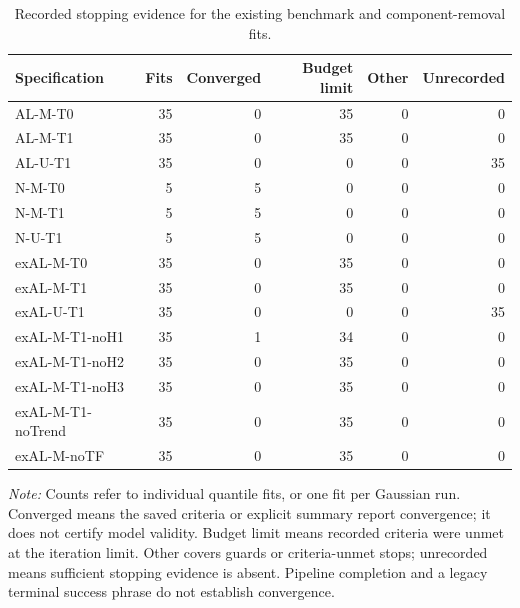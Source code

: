 \begin{table}[!htbp]
\centering
\begin{threeparttable}
\caption{Recorded stopping evidence for the existing benchmark and component-removal fits.}
\label{tab:comment2_fit_diagnostics}
\fontsize{8.5}{10.5}\selectfont
\begin{tabular}{lrrrrr}
\hline
Specification & Fits & Converged & Budget limit & Other & Unrecorded \\
\hline
AL-M-T0 & 35 & 0 & 35 & 0 & 0 \\
AL-M-T1 & 35 & 0 & 35 & 0 & 0 \\
AL-U-T1 & 35 & 0 & 0 & 0 & 35 \\
N-M-T0 & 5 & 5 & 0 & 0 & 0 \\
N-M-T1 & 5 & 5 & 0 & 0 & 0 \\
N-U-T1 & 5 & 5 & 0 & 0 & 0 \\
exAL-M-T0 & 35 & 0 & 35 & 0 & 0 \\
exAL-M-T1 & 35 & 0 & 35 & 0 & 0 \\
exAL-U-T1 & 35 & 0 & 0 & 0 & 35 \\
exAL-M-T1-noH1 & 35 & 1 & 34 & 0 & 0 \\
exAL-M-T1-noH2 & 35 & 0 & 35 & 0 & 0 \\
exAL-M-T1-noH3 & 35 & 0 & 35 & 0 & 0 \\
exAL-M-T1-noTrend & 35 & 0 & 35 & 0 & 0 \\
exAL-M-noTF & 35 & 0 & 35 & 0 & 0 \\
\hline
\end{tabular}
\begin{tablenotes}
\fontsize{8}{10}\selectfont
\item \textit{Note:} Counts refer to individual quantile fits, or one fit per Gaussian run. Converged means the saved criteria or explicit summary report convergence; it does not certify model validity. Budget limit means recorded criteria were unmet at the iteration limit. Other covers guards or criteria-unmet stops; unrecorded means sufficient stopping evidence is absent. Pipeline completion and a legacy terminal success phrase do not establish convergence.
\end{tablenotes}
\end{threeparttable}
\end{table}
